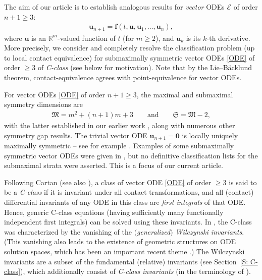 \documentclass[pdftex]{sigma}%
\newcommand\bu{\mathbf{u}}
\newcommand\fM{\mathfrak{M}}
\newcommand\fS{\mathfrak{S}}
\newcommand{\R}{\mathbb{R}}
\newcommand\cE{\mathcal{E}}
\numberwithin{equation}{section}
\begin{document}
The aim of our article is to establish analogous results for {\em vector} ODEs $\cE$ of order $n+1 \geq 3$:
\begin{align} \label{ODE}
\bu_{n+1} = \mathbf{f}(t,\bu,\bu_1,\dots,\bu_{n}),
\end{align}
where $\bu$ is an $\R^m$-valued function of $t$ (for $m \ge 2$), and $\bu_{k}$ is its $k$-th derivative. More precisely, we consider and completely resolve the classification problem (up to local contact equivalence) for submaximally symmetric vector ODEs \eqref{ODE} of order $\ge 3$ of {\em C-class} \cite{CDT2020, Cartan1938} (see below for motivation). Note that by the Lie--B\"{a}cklund theorem, contact-equivalence agrees with point-equivalence for vector ODEs.

For vector ODEs \eqref{ODE} of order $n+1 \ge 3$, the maximal and submaximal symmetry dimensions are
\begin{align}\label{E:MS}
\fM = m^2+(n+1)m+3 \qquad \text{and}\qquad \fS= \fM-2,
\end{align}
with the latter established in our earlier work \cite{KT2021}, along with numerous other symmetry gap results.
The trivial vector ODE $\bu_{n+1} = \mathbf{0}$ is locally uniquely maximally symmetric -- see for example \cite[Corollary~2.8]{KT2021}. Examples of some submaximally symmetric vector ODEs were given in \cite[Table 8]{KT2021}, but no definitive classification lists for the submaximal strata were asserted. This is a focus of our current article.

Following Cartan \cite{Cartan1938} (see also \cite{Bryant1991,CDT2020,Grossman2000}), a class of vector ODE \eqref{ODE} of order $\ge 3$ is said to be a {\em C-class} if it is invariant under all contact transformations, and all (contact) differential invariants of any ODE in this class are {\em first integrals} of that ODE. Hence, generic C-class equations (having sufficiently many functionally independent first integrals) can be solved using these invariants. In \cite[Theorem~4.1 and~4.2]{CDT2020}, the C-class was characterized by the vanishing of the {\em $($generalized$)$ Wilczynski invariants}. (This vanishing also leads to the existence of geometric structures on ODE solution spaces, which has been an important recent theme \cite{CDT2013, DT2006, GN2009, GN2010, Krynski2016}.) The Wilczynski invariants are a subset of the fundamental (relative) invariants (see Section~\ref{S: C-class}), which additionally consist of {\em C-class invariants} (in the terminology of \cite{KT2021}).
\end{document}
